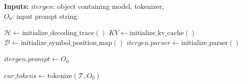 
\begin{algorithm}
\footnotesize
\caption{Start function that initiates \Tool{} session}
\label{alg:start}

\begin{flushleft}
\textbf{Inputs:} $\textit{itergen}$: object containing model, tokenizer, \\
$O_0$: input prompt string \\
\end{flushleft}

\begin{algorithmic}[1]
    \State $\mathcal{H} \gets \text{initialize\_decoding\_trace}()$ 
    \State $KV \gets \text{initialize\_kv\_cache}()$ 
    \State $\mathcal{D} \gets \text{initialize\_symbol\_position\_map}()$ 
    \State $\textit{itergen.parser}  \gets \text{initialize\_parser}()$ 

    \State $\textit{itergen.prompt} \gets O_0$ 

    \State $\textit{cur\_tokens} \gets \text{tokenize}(\mathcal{T}, O_0)$
    \EndFunction
\end{algorithmic}
\end{algorithm}

